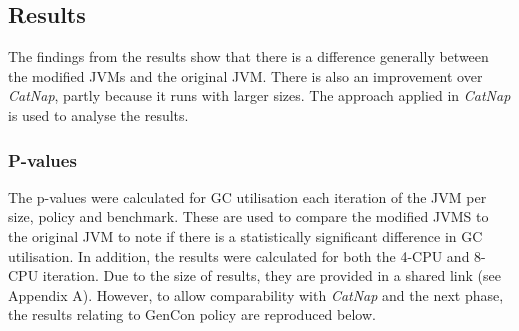 \subsection{Results}
The findings from the results show that there is a difference generally
between the modified JVMs and the original JVM. There is also an
improvement over \emph{CatNap}, partly because it runs with larger sizes.
\newline\newline
The approach applied in \emph{CatNap} is used to analyse the results. 
\subsubsection{P-values}
The
p-values were calculated for GC utilisation each iteration of the JVM per size, policy and benchmark. These are used to compare the modified JVMS to the original JVM to note if there is a statistically significant difference in GC utilisation. In addition, the results were calculated for both
the 4-CPU and 8-CPU iteration. Due to the size of results, they are
provided in a shared link (see Appendix A). However, to allow
comparability with \emph{CatNap} and the next phase, the results relating to
GenCon policy are reproduced below.
\newline\newline
